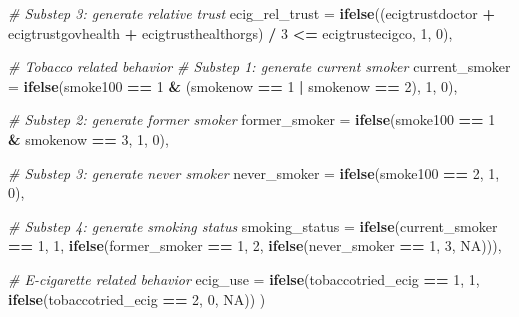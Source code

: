 \documentclass[
]{article}
\newenvironment{Shaded}{\begin{snugshade}}{\end{snugshade}}
\newcommand{\AttributeTok}[1]{\textcolor[rgb]{0.13,0.29,0.53}{#1}}
\newcommand{\CommentTok}[1]{\textcolor[rgb]{0.56,0.35,0.01}{\textit{#1}}}
\newcommand{\ConstantTok}[1]{\textcolor[rgb]{0.56,0.35,0.01}{#1}}
\newcommand{\DecValTok}[1]{\textcolor[rgb]{0.00,0.00,0.81}{#1}}
\newcommand{\FunctionTok}[1]{\textcolor[rgb]{0.13,0.29,0.53}{\textbf{#1}}}
\newcommand{\NormalTok}[1]{#1}
\newcommand{\SpecialCharTok}[1]{\textcolor[rgb]{0.81,0.36,0.00}{\textbf{#1}}}
\begin{document}
\begin{Shaded}
\begin{Highlighting}[]
  \CommentTok{\# Substep 3: generate \textquotesingle{}relative trust\textquotesingle{}}
  \AttributeTok{ecig\_rel\_trust =} \FunctionTok{ifelse}\NormalTok{((ecigtrustdoctor }\SpecialCharTok{+}\NormalTok{ ecigtrustgovhealth }\SpecialCharTok{+}\NormalTok{ ecigtrusthealthorgs) }\SpecialCharTok{/} \DecValTok{3} \SpecialCharTok{\textless{}=}\NormalTok{ ecigtrustecigco, }\DecValTok{1}\NormalTok{, }\DecValTok{0}\NormalTok{),}
  
  \CommentTok{\# Tobacco related behavior}
  \CommentTok{\# Substep 1: generate current smoker}
  \AttributeTok{current\_smoker =} \FunctionTok{ifelse}\NormalTok{(smoke100 }\SpecialCharTok{==} \DecValTok{1} \SpecialCharTok{\&}\NormalTok{ (smokenow }\SpecialCharTok{==} \DecValTok{1} \SpecialCharTok{|}\NormalTok{ smokenow }\SpecialCharTok{==} \DecValTok{2}\NormalTok{), }\DecValTok{1}\NormalTok{, }\DecValTok{0}\NormalTok{),}
  
  \CommentTok{\# Substep 2: generate former smoker}
  \AttributeTok{former\_smoker =} \FunctionTok{ifelse}\NormalTok{(smoke100 }\SpecialCharTok{==} \DecValTok{1} \SpecialCharTok{\&}\NormalTok{ smokenow }\SpecialCharTok{==} \DecValTok{3}\NormalTok{, }\DecValTok{1}\NormalTok{, }\DecValTok{0}\NormalTok{),}
  
  \CommentTok{\# Substep 3: generate never smoker}
  \AttributeTok{never\_smoker =} \FunctionTok{ifelse}\NormalTok{(smoke100 }\SpecialCharTok{==} \DecValTok{2}\NormalTok{, }\DecValTok{1}\NormalTok{, }\DecValTok{0}\NormalTok{),}
  
  \CommentTok{\# Substep 4: generate \textquotesingle{}smoking status\textquotesingle{}}
  \AttributeTok{smoking\_status =} \FunctionTok{ifelse}\NormalTok{(current\_smoker }\SpecialCharTok{==} \DecValTok{1}\NormalTok{, }\DecValTok{1}\NormalTok{,}
                          \FunctionTok{ifelse}\NormalTok{(former\_smoker }\SpecialCharTok{==} \DecValTok{1}\NormalTok{, }\DecValTok{2}\NormalTok{,}
                                 \FunctionTok{ifelse}\NormalTok{(never\_smoker }\SpecialCharTok{==} \DecValTok{1}\NormalTok{, }\DecValTok{3}\NormalTok{, }\ConstantTok{NA}\NormalTok{))),}
  
  \CommentTok{\# E{-}cigarette related behavior}
  \AttributeTok{ecig\_use =} \FunctionTok{ifelse}\NormalTok{(tobaccotried\_ecig }\SpecialCharTok{==} \DecValTok{1}\NormalTok{, }\DecValTok{1}\NormalTok{,}
                    \FunctionTok{ifelse}\NormalTok{(tobaccotried\_ecig }\SpecialCharTok{==} \DecValTok{2}\NormalTok{, }\DecValTok{0}\NormalTok{, }\ConstantTok{NA}\NormalTok{))}
\NormalTok{  )}





\end{Highlighting}
\end{Shaded}
\end{document}
